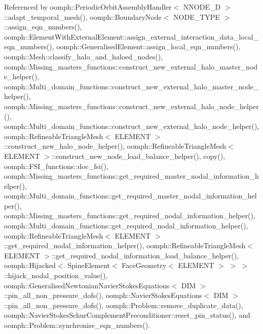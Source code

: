 Referenced by oomph\+::\+Periodic\+Orbit\+Assembly\+Handler$<$ N\+N\+O\+D\+E\+\_\+D $>$\+::adapt\+\_\+temporal\+\_\+mesh(), oomph\+::\+Boundary\+Node$<$ N\+O\+D\+E\+\_\+\+T\+Y\+P\+E $>$\+::assign\+\_\+eqn\+\_\+numbers(), oomph\+::\+Element\+With\+External\+Element\+::assign\+\_\+external\+\_\+interaction\+\_\+data\+\_\+local\+\_\+eqn\+\_\+numbers(), oomph\+::\+Generalised\+Element\+::assign\+\_\+local\+\_\+eqn\+\_\+numbers(), oomph\+::\+Mesh\+::classify\+\_\+halo\+\_\+and\+\_\+haloed\+\_\+nodes(), oomph\+::\+Missing\+\_\+masters\+\_\+functions\+::construct\+\_\+new\+\_\+external\+\_\+halo\+\_\+master\+\_\+node\+\_\+helper(), oomph\+::\+Multi\+\_\+domain\+\_\+functions\+::construct\+\_\+new\+\_\+external\+\_\+halo\+\_\+master\+\_\+node\+\_\+helper(), oomph\+::\+Missing\+\_\+masters\+\_\+functions\+::construct\+\_\+new\+\_\+external\+\_\+halo\+\_\+node\+\_\+helper(), oomph\+::\+Multi\+\_\+domain\+\_\+functions\+::construct\+\_\+new\+\_\+external\+\_\+halo\+\_\+node\+\_\+helper(), oomph\+::\+Refineable\+Triangle\+Mesh$<$ E\+L\+E\+M\+E\+N\+T $>$\+::construct\+\_\+new\+\_\+halo\+\_\+node\+\_\+helper(), oomph\+::\+Refineable\+Triangle\+Mesh$<$ E\+L\+E\+M\+E\+N\+T $>$\+::construct\+\_\+new\+\_\+node\+\_\+load\+\_\+balance\+\_\+helper(), copy(), oomph\+::\+F\+S\+I\+\_\+functions\+::doc\+\_\+fsi(), oomph\+::\+Missing\+\_\+masters\+\_\+functions\+::get\+\_\+required\+\_\+master\+\_\+nodal\+\_\+information\+\_\+helper(), oomph\+::\+Multi\+\_\+domain\+\_\+functions\+::get\+\_\+required\+\_\+master\+\_\+nodal\+\_\+information\+\_\+helper(), oomph\+::\+Missing\+\_\+masters\+\_\+functions\+::get\+\_\+required\+\_\+nodal\+\_\+information\+\_\+helper(), oomph\+::\+Multi\+\_\+domain\+\_\+functions\+::get\+\_\+required\+\_\+nodal\+\_\+information\+\_\+helper(), oomph\+::\+Refineable\+Triangle\+Mesh$<$ E\+L\+E\+M\+E\+N\+T $>$\+::get\+\_\+required\+\_\+nodal\+\_\+information\+\_\+helper(), oomph\+::\+Refineable\+Triangle\+Mesh$<$ E\+L\+E\+M\+E\+N\+T $>$\+::get\+\_\+required\+\_\+nodal\+\_\+information\+\_\+load\+\_\+balance\+\_\+helper(), oomph\+::\+Hijacked$<$ Spine\+Element$<$ Face\+Geometry$<$ E\+L\+E\+M\+E\+N\+T $>$ $>$ $>$\+::hijack\+\_\+nodal\+\_\+position\+\_\+value(), oomph\+::\+Generalised\+Newtonian\+Navier\+Stokes\+Equations$<$ D\+I\+M $>$\+::pin\+\_\+all\+\_\+non\+\_\+pressure\+\_\+dofs(), oomph\+::\+Navier\+Stokes\+Equations$<$ D\+I\+M $>$\+::pin\+\_\+all\+\_\+non\+\_\+pressure\+\_\+dofs(), oomph\+::\+Problem\+::remove\+\_\+duplicate\+\_\+data(), oomph\+::\+Navier\+Stokes\+Schur\+Complement\+Preconditioner\+::reset\+\_\+pin\+\_\+status(), and oomph\+::\+Problem\+::synchronise\+\_\+eqn\+\_\+numbers().

